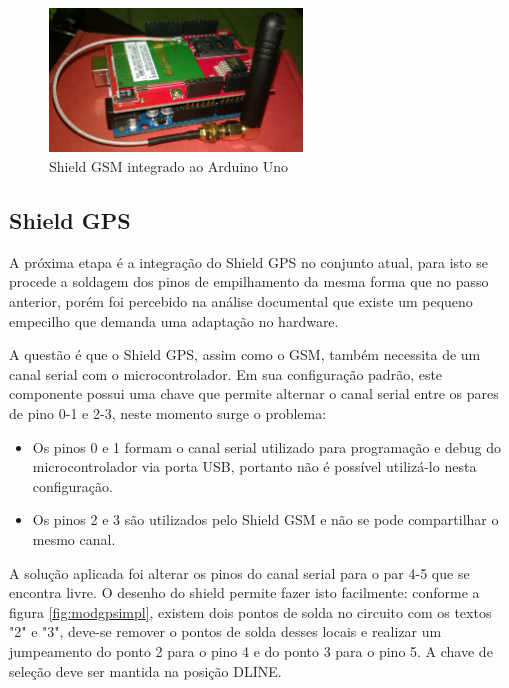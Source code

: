 \begin{figure}[!htb]
\centering
\includegraphics[width=0.6\textwidth]{figures/arduinoAndGSM.jpg}
\caption{Shield GSM integrado ao Arduino Uno}
\label{fig:shieldgsmimpl}
\end{figure}

\newpage
\subsection{Shield GPS}

A próxima etapa é a integração do Shield GPS no conjunto atual, para isto se procede a soldagem dos pinos de empilhamento da mesma forma que no passo anterior, porém foi percebido na análise documental que existe um pequeno empecilho que demanda uma adaptação no hardware.

A questão é que o Shield GPS, assim como o GSM, também necessita de um canal serial com o microcontrolador. Em sua configuração padrão, este componente possui uma chave que permite alternar o canal serial entre os pares de pino 0-1 e 2-3, neste momento surge o problema:

\begin{itemize}
	\item Os pinos 0 e 1 formam o canal serial utilizado para programação e debug do microcontrolador via porta USB, portanto não é possível utilizá-lo nesta configuração.
	\item Os pinos 2 e 3 são utilizados pelo Shield GSM e não se pode compartilhar o mesmo canal.
\end{itemize}

A solução aplicada foi alterar os pinos do canal serial para o par 4-5 que se encontra livre. O desenho do shield permite fazer isto facilmente: conforme a figura \ref{fig:modgpsimpl}, existem dois pontos de solda no circuito com os textos "2" e "3", deve-se remover o pontos de solda desses locais e realizar um jumpeamento do ponto 2 para o pino 4 e do ponto 3 para o pino 5. A chave de seleção deve ser mantida na posição DLINE.

